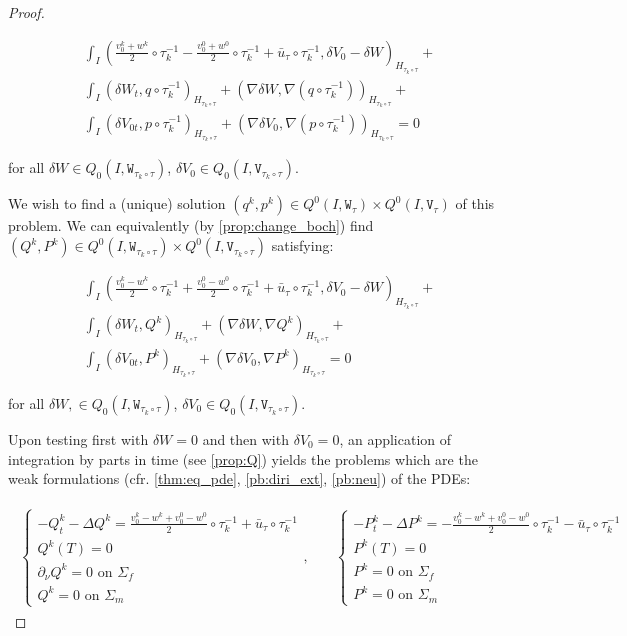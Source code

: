\documentclass[english,a4paper,9pt,oneside]{scrbook}	%
\theoremstyle{break}
\newenvironment{mproof}[1][\proofname]{%
  \begin{proof}[#1]$ $\par\nobreak\ignorespaces
}{%
  \end{proof}
}
\renewcommand*{\proofname}{Proof}
\theoremstyle{remark}
\newcommand{\tw}[1]{\texttt{#1}}
\begin{document}
\begin{mproof}
\begin{align*}
\int_I \left (\frac{v_0^k+w^k}{2}\circ \tau_k^{-1}- \frac{v_0^0+w^0}{2}\circ \tau_k^{-1}+\bar{u}_\tau\circ \tau_k^{-1} ,\delta V_0-\delta W\right)_{H_{\tau_k \circ \tau}}+\\
\int_I ( \delta W_t , q\circ \tau_k^{-1})_{H_{\tau_k \circ \tau}}+ (\nabla\delta W, \nabla( q\circ \tau_k^{-1}))_{H_{\tau_k \circ \tau}}+\\
\int_I ( \delta V_{0t},p \circ \tau_k^{-1})_{H_{\tau_k \circ \tau}} + ( \nabla \delta V_0, \nabla (p\circ \tau_k^{-1}))_{H_{\tau_k \circ \tau}} = 0
\end{align*}

for all $\delta W \in Q_0(I, \tw{W}_{\tau_k \circ \tau})$, $ \delta V_{0} \in Q_0(I,\tw{V}_{\tau_k \circ \tau})$.

We wish to find a (unique) solution $(q^k, p^k) \in Q^0(I, \tw{W}_\tau)\times Q^0(I, \tw{V}_\tau)$ of this problem. We can equivalently (by \cref{prop:change_boch}) find $(Q^k, P^k) \in Q^0(I, \tw{W}_{\tau_k \circ \tau})\times Q^0(I, \tw{V}_{\tau_k \circ \tau})$ satisfying:

\begin{align*}
\int_I \left (\frac{v_0^k-w^k}{2}\circ \tau_k^{-1}+ \frac{v_0^0-w^0}{2}\circ \tau_k^{-1}+\bar{u}_\tau\circ \tau_k^{-1} ,\delta V_0-\delta W\right)_{H_{\tau_k \circ \tau}}+\\
\int_I (\delta W_t ,Q^k )_{H_{\tau_k \circ \tau}}+ (\nabla \delta W, \nabla Q^k)_{H_{\tau_k \circ \tau}}+\\
\int_I( \delta V_{0t},P^k)_{H_{\tau_k \circ \tau}} + ( \nabla \delta V_0, \nabla P^k)_{H_{\tau_k \circ \tau}} = 0
\end{align*}

for all $\delta W, \in Q_0(I, \tw{W}_{\tau_k \circ \tau})$, $ \delta V_{0} \in Q_0(I,\tw{V}_{\tau_k \circ \tau})$.

Upon testing first with $\delta W=0$ and then with $\delta V_0=0$, an application of integration by parts in time (see \cref{prop:Q}) yields the problems which are the weak formulations (cfr. \cref{thm:eq_pde}, \cref{pb:diri_ext}, \cref{pb:neu}) of the PDEs:

\begin{align*}
\begin{matrix}
\left\{\begin{matrix}
-Q^k_t-\Delta Q^k =\frac{v_0^k-w^k+v_0^0-w^0}{2}\circ \tau_k^{-1}+\bar{u}_\tau\circ \tau_k^{-1} \\
Q^k(T)=0\\
\partial_\nu Q^k = 0 \text{ on } \Sigma_f\\
Q^k = 0 \text{ on } \Sigma_m
\end{matrix}\right.
, \quad &
\left\{\begin{matrix}
-P^k_t-\Delta P^k =-\frac{v_0^k-w^k+v_0^0-w^0}{2}\circ \tau_k^{-1}-\bar{u}_\tau\circ \tau_k^{-1} \\
P^k(T)=0\\
P^k = 0 \text{ on } \Sigma_f\\
P^k = 0 \text{ on } \Sigma_m
\end{matrix}\right.
\end{matrix}
\end{align*}


\end{mproof}
\end{document}
